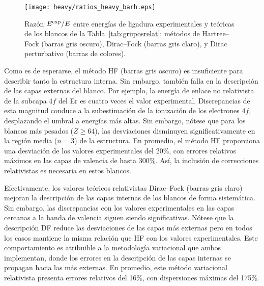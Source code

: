 \begin{figure}
\centering
\texttt{[image: heavy/ratios\_heavy\_barh.eps]} 
\caption[Razón $E^{\mbox{\scriptsize exp}}/E$ entre energías de ligadura 
experimentales y teóricas.]
{Razón $E^{\mbox{\scriptsize exp}}/E$ entre energías de ligadura 
experimentales y teóricas de los blancos de la 
Tabla~\ref{tab:gruposrelat}: métodos de Hartree--Fock (barras gris 
oscuro), Dirac--Fock (barras gris claro), y Dirac perturbativo (barras 
de colores).}
\label{fig:ratios}
\end{figure}

Como es de esperarse, el método HF (barras gris oscuro) es insuficiente 
para describir tanto la estructura interna. Sin embargo, también falla 
en la descripción de las capas externas del blanco. Por ejemplo, la 
energía de enlace no relativista de la subcapa $4f$ del Er es cuatro 
veces el valor experimental. Discrepancias de esta magnitud conduce a la 
subestimación de la ionización de los electrones $4f$, desplazando el 
umbral a energías más altas. Sin embargo, nótese que para los blancos 
más pesados ($Z\ge 64$), las desviaciones disminuyen significativamente 
en la región media ($n=3$) de la estructura. En promedio, el método HF 
proporciona una desviación de los valores experimentales del 20\%, con 
errores relativos máximos en las capas de valencia de hasta 300\%. Así, 
la inclusión de correcciones relativistas es necesaria en estos blancos.

Efectivamente, los valores teóricos relativistas Dirac--Fock (barras 
gris claro) mejoran la descripción de las capas internas de los blancos 
de forma sistemática. Sin embargo, las discrepancias con los valores 
experimentales en las capas cercanas a la banda de valencia siguen 
siendo significativas. Nótese que la descripción DF reduce las 
desviaciones de las capas más externas pero en todos los casos mantiene 
la misma relación que HF con los valores experimentales. Este 
comportamiento es atribuible a la metodología variacional que ambos 
implementan, donde los errores en la descripción de las capas internas 
se propagan hacia las más externas. En promedio, este método variacional 
relativista presenta errores relativos del 16\%, con dispersiones 
máximas del 175\%. 

